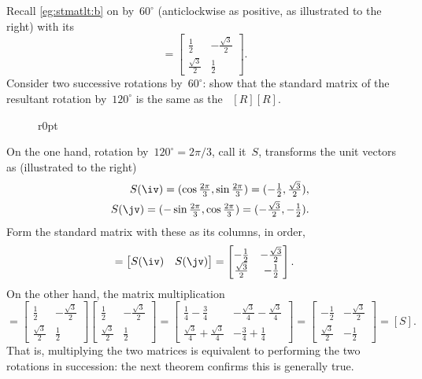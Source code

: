 \begin{example} 
Recall \cref{eg:stmatlt:b} on  by~\(60^\circ\) (anticlockwise as positive, as illustrated to the right) with its 
\begin{equation*}
[R]=\begin{bmatrix} \frac12&-\frac{\sqrt3}2
\\\frac{\sqrt3}2&\frac12 \end{bmatrix}.
\end{equation*}
Consider two successive rotations by~\(60^\circ\): show that the standard matrix of the resultant rotation by~\(120^\circ\)  is the same as the ~\([R][R]\).

\begin{solution} 
\begin{wrapfigure}r{0pt}
\end{wrapfigure}
On the one hand, rotation by~\(120^\circ=2\pi/3\), call it~\(S\), transforms the unit vectors as (illustrated to the right)
\begin{eqnarray*}
&&S(\iv)=(\cos\tfrac{2\pi}3,\sin\tfrac{2\pi}3)
=(-\tfrac12,\tfrac{\sqrt3}2),
\\&&S(\jv)=(-\sin\tfrac{2\pi}3,\cos\tfrac{2\pi}3)
=(-\tfrac{\sqrt3}2,-\tfrac12).
\end{eqnarray*}
Form the standard matrix with these as its columns, in order,
\begin{equation*}
[S]=\begin{bmatrix} S(\iv)&S(\jv) \end{bmatrix}
=\begin{bmatrix} -\frac12&-\frac{\sqrt3}2
\\\frac{\sqrt3}2&-\frac12 \end{bmatrix}.
\end{equation*}
On the other hand, the matrix multiplication
\begin{equation*}
[R][R]
=\begin{bmatrix} \frac12&-\frac{\sqrt3}2
\\\frac{\sqrt3}2&\frac12 \end{bmatrix}\begin{bmatrix} \frac12&-\frac{\sqrt3}2
\\\frac{\sqrt3}2&\frac12 \end{bmatrix}
=\begin{bmatrix} \tfrac14-\tfrac34 & -\tfrac{\sqrt3}4-\tfrac{\sqrt3}4
\\ \tfrac{\sqrt3}4+\tfrac{\sqrt3}4 & -\tfrac34+\tfrac14\end{bmatrix}
=\begin{bmatrix} -\frac12&-\frac{\sqrt3}2
\\\frac{\sqrt3}2&-\frac12 \end{bmatrix}=[S].
\end{equation*}
That is, multiplying the two matrices is equivalent to performing the two rotations in succession: the next theorem confirms this is generally true.
\aqed

\end{solution}
\end{example}




